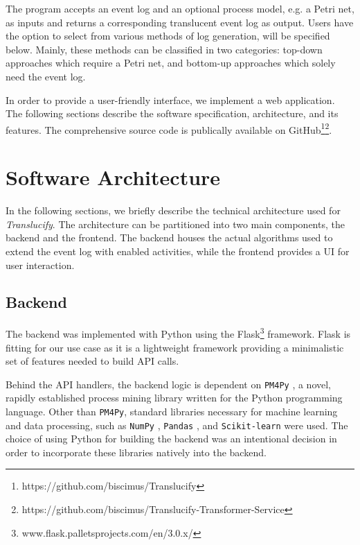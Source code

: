 

The program accepts an event log and an optional process model, e.g. a Petri net, as inputs and returns a corresponding translucent event log as output. Users have the option to select from various methods of log generation, will be specified below. Mainly, these methods can be classified in two categories: top-down approaches which require a Petri net, and bottom-up approaches which solely need the event log.

In order to provide a user-friendly interface, we implement a web application. The following sections describe the software specification, architecture, and its features. The comprehensive source code is publically available on GitHub\footnote{https://github.com/biscimus/Translucify}\footnote{https://github.com/biscimus/Translucify-Transformer-Service}.

\section{Software Architecture}

In the following sections, we briefly describe the technical architecture used for \emph{Translucify}. The architecture can be partitioned into two main components, the backend and the frontend. The backend houses the actual algorithms used to extend the event log with enabled activities, while the frontend provides a UI for user interaction.

\subsection{Backend}

The backend was implemented with Python using the Flask\footnote{www.flask.palletsprojects.com/en/3.0.x/} framework. Flask is fitting for our use case as it is a lightweight framework providing a minimalistic set of features needed to build API calls.

Behind the API handlers, the backend logic is dependent on \texttt{PM4Py} \cite{pm4py}, a novel, rapidly established process mining library written for the Python programming language. Other than \texttt{PM4Py}, standard libraries necessary for machine learning and data processing, such as \texttt{NumPy} \cite{numpy}, \texttt{Pandas} \cite{pandas}, and \texttt{Scikit-learn} \cite{scikit-learn} were used. The choice of using Python for building the backend was an intentional decision in order to incorporate these libraries natively into the backend.

